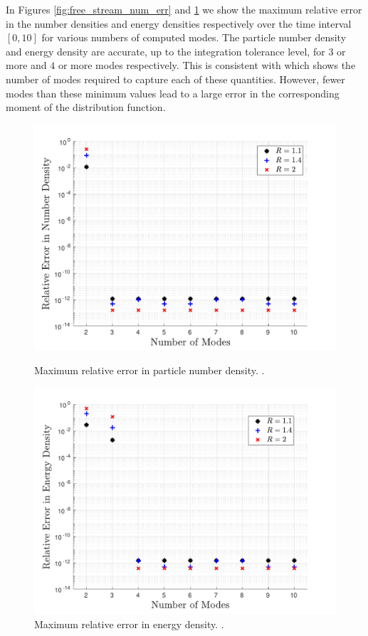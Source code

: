 In Figures \ref{fig:free_stream_num_err} and  \ref{fig:free_stream_E_err} we show the maximum relative error in the number densities and energy densities respectively over the time interval $[0,10]$ for various numbers of computed modes.  The particle number density and energy density are accurate, up to the integration tolerance level, for $3$ or more and $4$ or more modes respectively. This is consistent with  which shows the number of modes required to capture each of these quantities. However, fewer modes than these minimum values lead to a large error in the corresponding moment of the distribution function.
\begin{figure}
\centerline{\includegraphics[width=0.8\linewidth]{06-appendix/SpectralMethodBoltzmann/Figures/free_stream_num_err.pdf}}
\caption{Maximum relative error in particle number density. .}\label{fig:free_stream_num_err}
\centerline{\includegraphics[width=0.8\linewidth]{06-appendix/SpectralMethodBoltzmann/Figures/free_stream_E_err.pdf}}
\caption{Maximum relative error in energy density. .}\label{fig:free_stream_E_err}
\end{figure}

